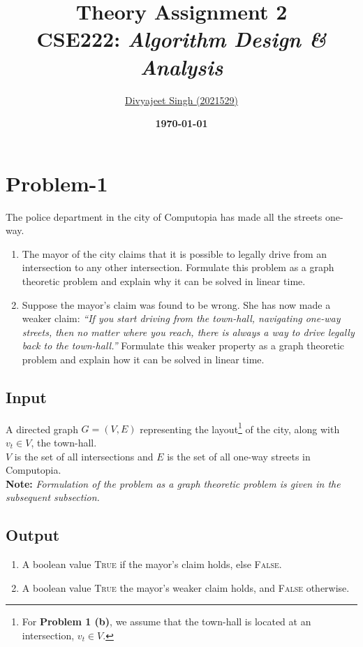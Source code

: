 \documentclass[12pt]{report}
\title{
    \textbf{\Huge{Theory Assignment 2}} \\
    \vspace*{15pt}
    \large{CSE222: \textit{Algorithm Design \& Analysis}}
}
\author{
    \href{mailto:divyajeet21529@iiitd.ac.in}{Divyajeet Singh (2021529)}
}
\date{
    \vspace*{10pt}
    \textbf{\today}
}
\begin{document}
    \maketitle

    \section*{\huge{Problem-1}}
    The police department in the city of Computopia has made all the streets one-way.
    \begin{enumerate}[label=(\alph*)]
        \item
        The mayor of the city claims that it is possible to legally drive from an intersection to any other intersection.
        Formulate this problem as a graph theoretic problem and explain why it can be solved in linear time.
        \item
        Suppose the mayor's claim was found to be wrong. She has now made a weaker claim:
        \textit{``If you start driving from the town-hall, navigating one-way streets, then no matter where you reach,
        there is always a way to drive legally back to the town-hall.''}
        Formulate this weaker property as a graph theoretic problem and explain how it can be solved in linear time.
    \end{enumerate}

    \subsection*{Input}
    A directed graph $G = (V, E)$ representing the layout\footnote{
        For \textbf{Problem 1 (b)}, we assume that the town-hall is located at an intersection, $v_{t} \in V$.
    } of the city, along with $v_{t} \in V$, the town-hall. \\
    $V$ is the set of all intersections and $E$ is the set of all one-way streets in Computopia.
    \vspace*{7.5pt} \\
    \textbf{Note:} \textit{Formulation of the problem as a graph theoretic problem is given in the subsequent subsection.}

    \subsection*{Output}
    \begin{enumerate}[label=(\textbf{\alph*})]
        \item A boolean value \textsc{True} if the mayor's claim holds, else \textsc{False}.
        \item A boolean value \textsc{True} the mayor's weaker claim holds, and \textsc{False} otherwise.
    \end{enumerate}
\end{document}
